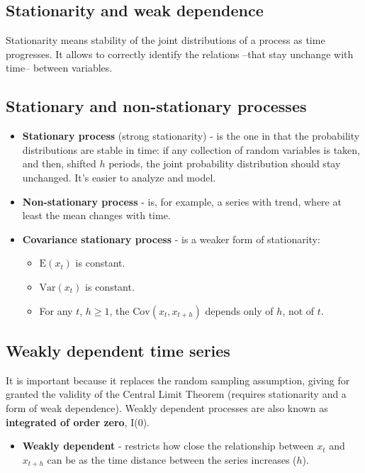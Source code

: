 \documentclass[10pt, a4paper, landscape]{extarticle}
\newcommand{\E}{\mathrm{E}}
\newcommand{\Var}{\mathrm{Var}}
\newcommand{\Cov}{\mathrm{Cov}}
\begin{document}
\begin{multicols}{3}
\section*{Stationarity and weak dependence}

Stationarity means stability of the joint distributions of a process as time progresses. It allows to correctly identify the relations --that stay unchange with time-- between variables.

\subsection*{Stationary and non-stationary processes}

\begin{itemize}[leftmargin=*]
	\item \textbf{Stationary process} (strong stationarity) - is the one in that the probability distributions are stable in time: if any collection of random variables is taken, and then, shifted $h$ periods, the joint probability distribution should stay unchanged. It's easier to analyze and model.

\columnbreak

	\item \textbf{Non-stationary process} - is, for example, a series with trend, where at least the mean changes with time.
	\item \textbf{Covariance stationary process} - is a weaker form of stationarity:
	\begin{itemize}[leftmargin=*]
		\item $\E(x_t)$ is constant.
		\item $\Var(x_t)$ is constant.
		\item For any $t$,  $h \geq 1$, the $\Cov(x_t, x_{t + h})$ depends only of $h$, not of $t$.
	\end{itemize}
\end{itemize}

\subsection*{Weakly dependent time series}

It is important because it replaces the random sampling assumption, giving for granted the validity of the Central Limit Theorem (requires stationarity and a form of weak dependence). Weakly dependent processes are also known as \textbf{integrated of order zero}, I(0).

\begin{itemize}[leftmargin=*]
	\item \textbf{Weakly dependent} - restricts how close the relationship between $x_t$ and $x_{t + h}$ can be as the time distance between the series increases ($h$).
\end{itemize}


\end{multicols}
\end{document}
